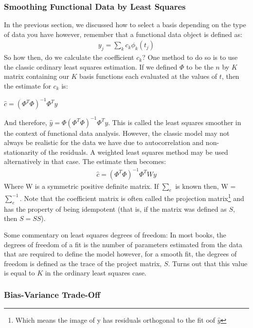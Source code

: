 \documentclass{article}
\begin{document}
\subsubsection{Smoothing Functional Data by Least Squares}

\noindent In the previous section, we discussed how to select a basis depending on the type of data you have however, remember that a functional data object is defined as:
\begin{align}
y_j = \sum_kc_k\phi_k(t_j)
\end{align}
\noindent So how then, do we calculate the coefficient $c_k$? One method to do so is to use the classic ordinary least squares estimation. If we defined $\Phi$ to be the $n$ by $K$ matrix containing our $K$ basis functions each evaluated at the values of $t$, then the estimate for $c_k$ is:

\begin{center}
$\hat{c} = (\Phi^T\Phi)^{-1}\Phi^Ty$
\end{center}

\noindent And therefore, $\hat{y} = \Phi(\Phi^T\Phi)^{-1}\Phi^Ty$. This is called the least squares smoother in the context of functional data analysis. However, the classic model may not always be realistic for the data we have due to autocorrelation and non-stationarity of the residuals. A weighted least squares method may be used alternatively in that case. The estimate then becomes:
\begin{align}
\hat{c} = (\Phi^T\Phi)^{-1}\Phi^TWy
\end{align}
\noindent Where W is a symmetric positive definite matrix. If $\sum_e$ is known then, W = $\sum_e^{-1}$. Note that the coefficient matrix is often called the projection matrix\footnote{Which means the image of y has residuals orthogonal to the fit oof $\hat{y}$} and has the property of being idempotent (that is, if the matrix was defined as $S$, then $S = SS$). 

\noindent Some commentary on least squares degrees of freedom: In most books, the degrees of freedom of a fit is the number of parameters estimated from the data that are required to define the model however, for a smooth fit, the degrees of freedom is defined as the trace of the project matrix, $S$. Turns out that this value is equal to $K$ in the ordinary least squares case. 

\subsubsection{Bias-Variance Trade-Off}
\end{document}
